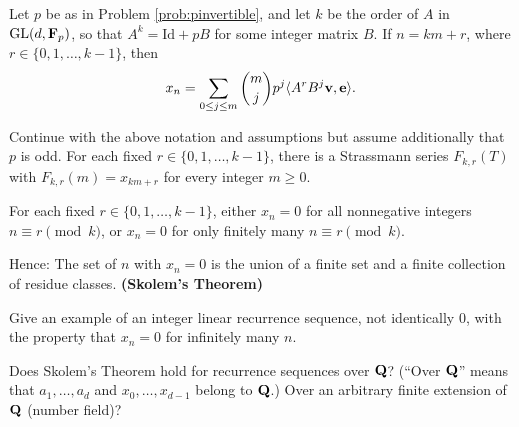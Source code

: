 \begin{prob}\label{prob:matrixexpression} Let $p$ be as in Problem \ref{prob:pinvertible}, and let $k$ be the order of $A$ in $\mathop{\mathrm{GL}}(d,\mathbf{F}_p)$, so that $A^k = \mathrm{Id} +pB$ for some integer matrix $B$. If $n=km+r$, where $r \in \{0,1,\dots,k-1\}$, then 
\[ x_n = \sum_{0 \le j \le m} \binom{m}{j} p^j \langle A^r B^j\mathbf{v},\mathbf{e}\rangle.  \]
\end{prob}

\begin{prob}\label{prob:matrixbinomial} Continue with the above notation and assumptions but assume additionally that $p$ is odd. For each fixed $r\in\{0,1,\dots,k-1\}$, there is a Strassmann series $F_{k,r}(T)$ with $F_{k,r}(m) = x_{km+r}$ for every integer $m\ge 0$.
\end{prob}

\begin{prob}\label{prob:skdichotomy} For each fixed $r\in\{0,1,\dots,k-1\}$, either $x_{n}=0$ for all nonnegative integers $n\equiv r\pmod{k}$, or $x_{n}=0$ for only finitely many $n\equiv r\pmod{k}$.  

Hence: The set of $n$ with $x_n=0$ is the union of a finite set and a finite collection of residue classes. \textbf{(Skolem's Theorem)}
\end{prob}

\begin{prob}\label{prob:easyrecurrence} Give an example of an integer linear recurrence sequence, not identically $0$, with the property that $x_n=0$ for infinitely many $n$.
\end{prob}

\begin{prob}[Mahler]\label{prob:mahlerSML} Does Skolem's Theorem hold for recurrence sequences over $\mathbf{Q}$? (``Over $\mathbf{Q}$'' means that $a_1,\dots,a_d$ and $x_0,\dots,x_{d-1}$ belong to $\mathbf{Q}$.) Over an arbitrary finite extension of $\mathbf{Q}$ (number field)?
\end{prob}


